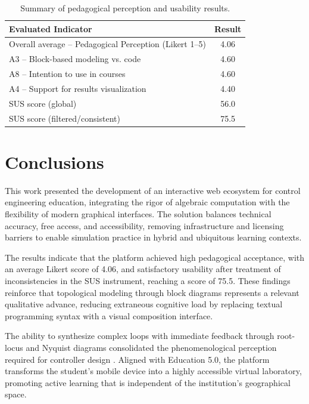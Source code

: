 \documentclass[conference]{IEEEtran}
\begin{document}
\begin{table}[htbp]
\caption{Summary of pedagogical perception and usability results.}
\label{tab:results}
\centering
\renewcommand{\arraystretch}{1.2}
\small
\begin{tabular}{lc}
\hline
\textbf{Evaluated Indicator} & \textbf{Result} \\ \hline
Overall average -- Pedagogical Perception (Likert 1--5) & 4.06 \\
A3 -- Block-based modeling vs. code & 4.60 \\
A8 -- Intention to use in courses & 4.60 \\
A4 -- Support for results visualization & 4.40 \\ \hline
SUS score (global) & 56.0 \\
SUS score (filtered/consistent) & 75.5 \\ \hline
\end{tabular}
\end{table}

\section{Conclusions}

This work presented the development of an interactive web ecosystem for control engineering education, integrating the rigor of algebraic computation with the flexibility of modern graphical interfaces. The solution balances technical accuracy, free access, and accessibility, removing infrastructure and licensing barriers to enable simulation practice in hybrid and ubiquitous learning contexts.

The results indicate that the platform achieved high pedagogical acceptance, with an average Likert score of 4.06, and satisfactory usability after treatment of inconsistencies in the SUS instrument, reaching a score of 75.5. These findings reinforce that topological modeling through block diagrams represents a relevant qualitative advance, reducing extraneous cognitive load \cite{SWELLER2024102423} by replacing textual programming syntax with a visual composition interface.

The ability to synthesize complex loops with immediate feedback through root-locus and Nyquist diagrams consolidated the phenomenological perception required for controller design \cite{nascimento2025}. Aligned with Education 5.0, the platform transforms the student's mobile device into a highly accessible virtual laboratory, promoting active learning that is independent of the institution's geographical space.
\end{document}
